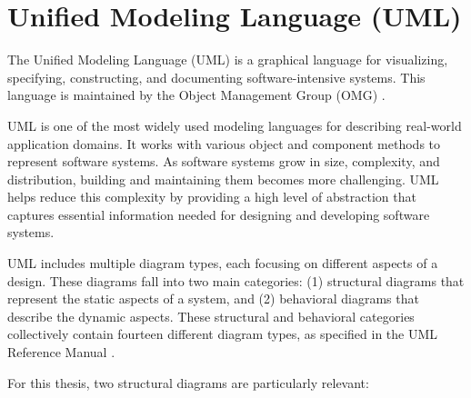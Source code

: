 \section{Unified Modeling Language (UML)}

\hspace{1cm} The Unified Modeling Language (UML) is a graphical language for 
visualizing, specifying, constructing, and documenting software-intensive systems. 
This language is maintained by the Object Management Group (OMG) \cite{UML}.

UML is one of the most widely used modeling languages for describing real-world 
application domains. It works with various object and component methods to represent 
software systems. As software systems grow in size, complexity, and distribution, 
building and maintaining them becomes more challenging. UML helps reduce this 
complexity by providing a high level of abstraction that captures essential 
information needed for designing and developing software systems.

UML includes multiple diagram types, each focusing on different aspects of a design. 
These diagrams fall into two main categories: (1) structural diagrams that represent 
the static aspects of a system, and (2) behavioral diagrams that describe the dynamic 
aspects. These structural and behavioral categories collectively contain fourteen 
different diagram types, as specified in the UML Reference Manual \cite{UML_Reference_Manual}.

For this thesis, two structural diagrams are particularly relevant:



